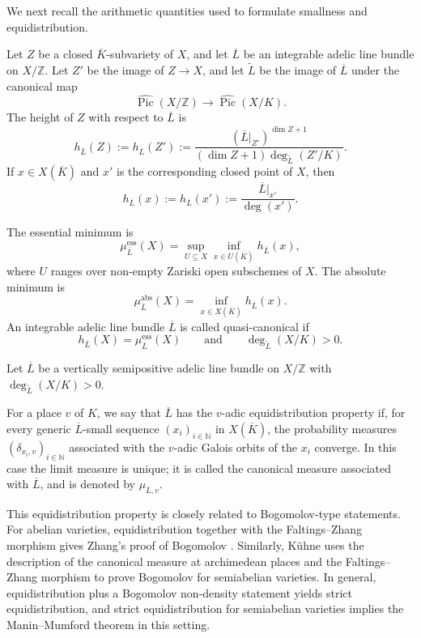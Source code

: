 \documentclass[10pt,a4paper]{amsart}
\theoremstyle{plain}
\theoremstyle{plain}
\numberwithin{equation}{section}
\begin{document}
We next recall the arithmetic quantities used to formulate smallness and
equidistribution.
\begin{defn}
	Let \(Z\) be a closed \(\overline K\)-subvariety of \(X\), and let
	\(\overline L\) be an integrable adelic line bundle on \(X/\mathbb Z\).  Let
	\(Z'\) be the image of \(Z\to X\), and let \(\widetilde L\) be the image of
	\(\overline L\) under the canonical map
	\[
	\widehat{\operatorname{Pic}}(X/\mathbb Z)
	\longrightarrow
	\widehat{\operatorname{Pic}}(X/K).
	\]
	The height of \(Z\) with respect to \(\overline L\) is
	\[
	h_{\overline L}(Z)
	:=
	h_{\overline L}(Z')
	:=
	\frac{(\overline L|_{Z'})^{\dim Z+1}}
	{(\dim Z+1)\deg_{\widetilde L}(Z'/K)}.
	\]
	If \(x\in X(\overline K)\) and \(x'\) is the corresponding closed point of
	\(X\), then
	\[
	h_{\overline L}(x):=h_{\overline L}(x')
	:=
	\frac{\overline L|_{x'}}{\deg(x')}.
	\]
	
	The essential minimum is
	\[
	\mu^{\mathrm{ess}}_{\overline L}(X)
	=
	\sup_{U\subseteq X}
	\inf_{x\in U(\overline K)} h_{\overline L}(x),
	\]
	where \(U\) ranges over non-empty Zariski open subschemes of \(X\).  The
	absolute minimum is
	\[
	\mu^{\mathrm{abs}}_{\overline L}(X)
	=
	\inf_{x\in X(\overline K)}h_{\overline L}(x).
	\]
	An integrable adelic line bundle \(\overline L\) is called quasi-canonical if
	\[
	h_{\overline L}(X)=\mu^{\mathrm{ess}}_{\overline L}(X)
	\qquad\text{and}\qquad
	\deg_{\widetilde L}(X/K)>0.
	\]
\end{defn}
Let \(\overline L\) be a vertically semipositive adelic line bundle on
\(X/\mathbb Z\) with \(\deg_{\widetilde L}(X/K)>0\).
\begin{defn}
	For a place \(v\) of \(K\), we say that \(\overline L\) has the
	\(v\)-adic equidistribution property if, for every generic
	\(\overline L\)-small sequence \((x_i)_{i\in\mathbb N}\) in
	\(X(\overline K)\), the probability measures
	\((\delta_{x_i,v})_{i\in\mathbb N}\) associated with the \(v\)-adic Galois
	orbits of the \(x_i\) converge.  In this case the limit measure is unique;
	it is called the canonical measure associated with \(\overline L\), and is
	denoted by \(\mu_{\overline L,v}\).
\end{defn}
This equidistribution property is closely related to Bogomolov-type
statements.  For abelian varieties, equidistribution together with the
Faltings--Zhang morphism gives Zhang's proof of Bogomolov \cite{Zha}.
Similarly, K\"uhne \cite{Ku1} uses the description of the canonical measure at
archimedean places and the Faltings--Zhang morphism to prove Bogomolov for
semiabelian varieties.  In general, equidistribution plus a Bogomolov
non-density statement yields strict equidistribution, and strict
equidistribution for semiabelian varieties implies the Manin--Mumford theorem
in this setting.
\end{document}
